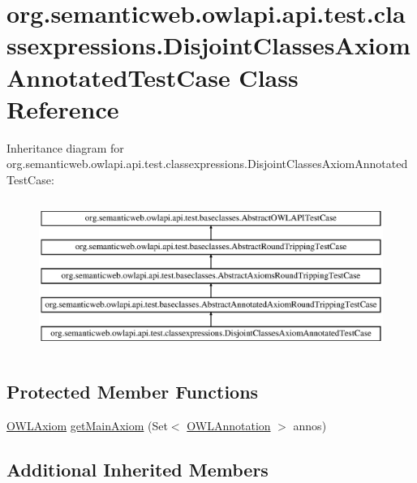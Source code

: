 \hypertarget{classorg_1_1semanticweb_1_1owlapi_1_1api_1_1test_1_1classexpressions_1_1_disjoint_classes_axiom_annotated_test_case}{\section{org.\-semanticweb.\-owlapi.\-api.\-test.\-classexpressions.\-Disjoint\-Classes\-Axiom\-Annotated\-Test\-Case Class Reference}
\label{classorg_1_1semanticweb_1_1owlapi_1_1api_1_1test_1_1classexpressions_1_1_disjoint_classes_axiom_annotated_test_case}
}
Inheritance diagram for org.\-semanticweb.\-owlapi.\-api.\-test.\-classexpressions.\-Disjoint\-Classes\-Axiom\-Annotated\-Test\-Case\-:\begin{figure}[H]
\begin{center}
\leavevmode
\includegraphics[height=5.000000cm]{classorg_1_1semanticweb_1_1owlapi_1_1api_1_1test_1_1classexpressions_1_1_disjoint_classes_axiom_annotated_test_case}
\end{center}
\end{figure}
\subsection*{Protected Member Functions}
\begin{DoxyCompactItemize}
\item 
\hyperlink{interfaceorg_1_1semanticweb_1_1owlapi_1_1model_1_1_o_w_l_axiom}{O\-W\-L\-Axiom} \hyperlink{classorg_1_1semanticweb_1_1owlapi_1_1api_1_1test_1_1classexpressions_1_1_disjoint_classes_axiom_annotated_test_case_aa7738e497f01f721ccd9a110811df3ae}{get\-Main\-Axiom} (Set$<$ \hyperlink{interfaceorg_1_1semanticweb_1_1owlapi_1_1model_1_1_o_w_l_annotation}{O\-W\-L\-Annotation} $>$ annos)
\end{DoxyCompactItemize}
\subsection*{Additional Inherited Members}


